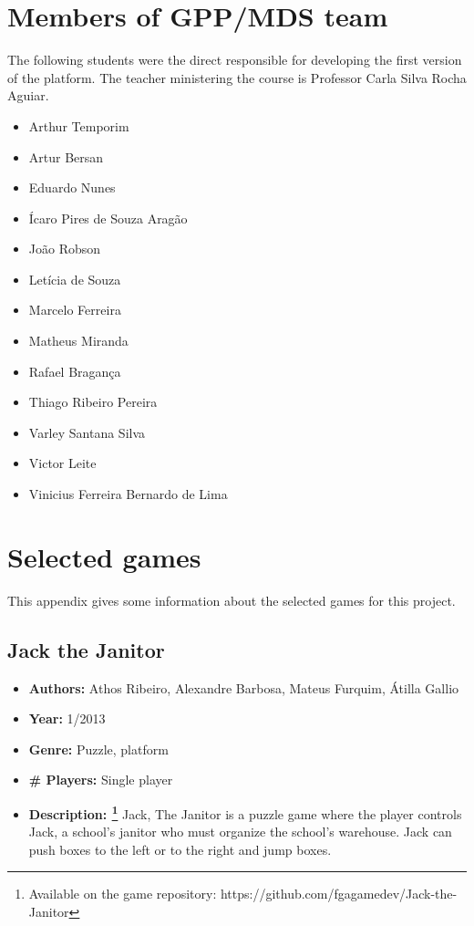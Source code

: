 \begin{apendicesenv}

\partapendices

\chapter{Members of GPP/MDS team}
\label {sec:apendice_a}

The following students were the direct responsible for developing the first version of the platform. The teacher ministering the course is Professor Carla Silva Rocha Aguiar.

\begin{itemize}
\item Arthur Temporim
\item Artur Bersan
\item Eduardo Nunes
\item Ícaro Pires de Souza Aragão
\item João Robson
\item Letícia de Souza
\item Marcelo Ferreira
\item Matheus Miranda
\item Rafael Bragança
\item Thiago Ribeiro Pereira
\item Varley Santana Silva
\item Victor Leite
\item Vinicius Ferreira Bernardo de Lima
\end{itemize}

\chapter{Selected games}
\label {sec:selected_games}

This appendix gives some information about the selected games for this project.

\section{Jack the Janitor}
\label {sec:jack_the_janitor}

\begin{itemize}
\item[] \textbf{Authors:} Athos Ribeiro, Alexandre Barbosa, Mateus Furquim, Átilla Gallio
\item[] \textbf{Year:} 1/2013
\item[] \textbf{Genre:} Puzzle, platform
\item[] \textbf{\# Players:} Single player
\item[] \textbf{Description: \footnote{Available on the game repository: https://github.com/fgagamedev/Jack-the-Janitor}} Jack, The Janitor is a puzzle game where the player controls Jack, a school's janitor who must organize the school's warehouse. Jack can push boxes to the left or to the right and jump boxes.


\end{itemize}
\end{apendicesenv}
